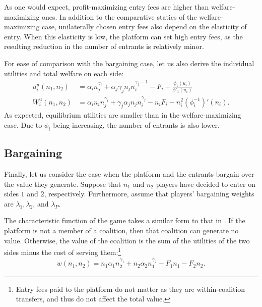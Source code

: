 As one would expect, profit-maximizing entry fees are higher than welfare-maximizing ones.
In addition to the comparative statics of the welfare-maximizing case, unilaterally chosen entry fees also depend on the elasticity of entry.
When this elasticity is low, the platform can set high entry fees, as the resulting reduction in the number of entrants is relatively minor.

For ease of comparison with the bargaining case, let us  also derive the individual utilities and total welfare on each side:
\begin{align*}
    u_i^u(n_1, n_2) &= \alpha_i n_j ^ {\gamma_i} + \alpha_j \gamma_j n_j n_i^{\gamma_j - 1} - F_i - \frac{\phi_1(u_i)}{\phi'_1(u_i)} \\
    W_i^u(n_1, n_2) &= \alpha_i n_i n_j ^ {\gamma_i} + \gamma_j \alpha_j n_j n_i^{\gamma_j} - n_i F_i - n_i^2 (\phi_i^{-1})'(n_i).
\end{align*}
As expected, equilibrium utilities are smaller than in the welfare-maximizing case.
Due to $\phi_i$ being increasing, the number of entrants is also lower.

\subsection{Bargaining}

Finally, let us consider the case when the platform and the entrants bargain over the value they generate.
Suppose that $n_1$ and $n_2$ players have decided to enter on sides $1$ and $2$, respectively.
Furthermore, assume that players' bargaining weights are $\lambda_1, \lambda_2$, and $\lambda_P$.

The characteristic function of the game takes a similar form to that in .
If the platform is not a member of a coalition, then that coalition can generate no value.
Otherwise, the value of the coalition is the sum of the utilities of the two sides minus the cost of serving them:\footnote{
    Entry fees paid to the platform do not matter as they are within-coalition transfers, and thus do not affect the total value.
}
\begin{align*}
    w(n_1, n_2) = n_1 \alpha_1 n_2^{\gamma_1} + n_2 \alpha_2 n_1^{\gamma_2} - F_1 n_1 - F_2 n_2.
\end{align*}

